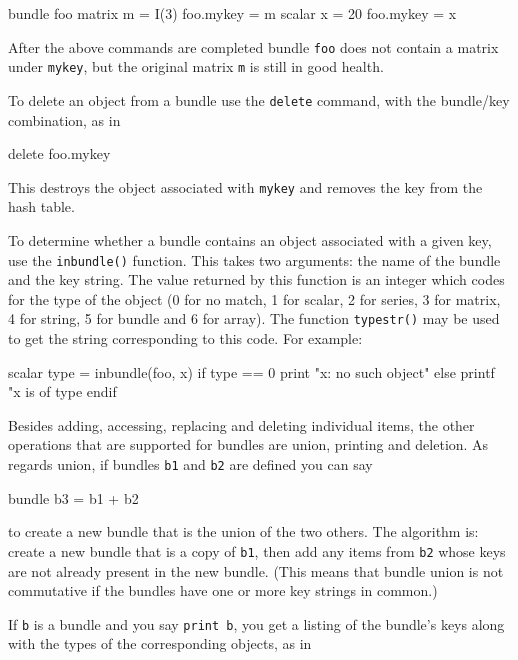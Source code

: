 \begin{code}
bundle foo
matrix m = I(3)
foo.mykey = m
scalar x = 20
foo.mykey = x
\end{code}

After the above commands are completed bundle \texttt{foo} does not
contain a matrix under \texttt{mykey}, but the original matrix
\texttt{m} is still in good health.

To delete an object from a bundle use the \texttt{delete} command,
with the bundle/key combination, as in

\begin{code}
delete foo.mykey
\end{code}

This destroys the object associated with \texttt{mykey} and removes
the key from the hash table.

To determine whether a bundle contains an object associated with a
given key, use the \texttt{inbundle()} function. This takes two
arguments: the name of the bundle and the key string. The value
returned by this function is an integer which codes for the type of
the object (0 for no match, 1 for scalar, 2 for series, 3 for matrix,
4 for string, 5 for bundle and 6 for array). The function
\texttt{typestr()} may be used to get the string corresponding to this
code. For example:

\begin{code}
scalar type = inbundle(foo, x)
if type == 0
  print "x: no such object"
else
  printf "x is of type %
endif
\end{code}

Besides adding, accessing, replacing and deleting individual items,
the other operations that are supported for bundles are union,
printing and deletion. As regards union, if bundles \texttt{b1} and
\texttt{b2} are defined you can say

\begin{code}
bundle b3 = b1 + b2
\end{code}

to create a new bundle that is the union of the two others. The
algorithm is: create a new bundle that is a copy of \texttt{b1}, then
add any items from \texttt{b2} whose keys are not already present in
the new bundle. (This means that bundle union is not commutative if
the bundles have one or more key strings in common.)

If \texttt{b} is a bundle and you say \texttt{print b}, you get a
listing of the bundle's keys along with the types of the corresponding
objects, as in


